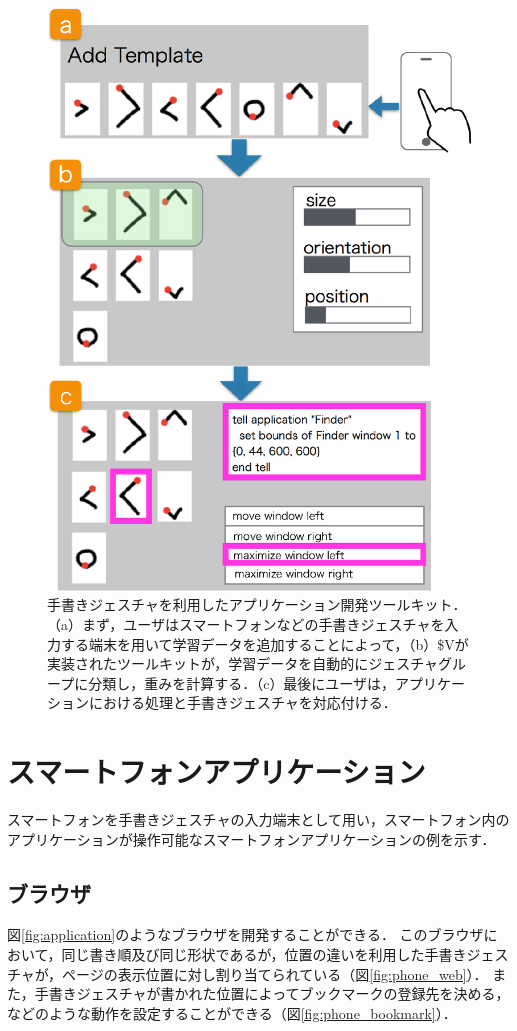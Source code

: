\begin{figure} [h!]
	\begin{center}
		\includegraphics [width=0.7\hsize ]{img/flow.eps}
	\end{center}
	\caption{手書きジェスチャを利用したアプリケーション開発ツールキット．（a）まず，ユーザはスマートフォンなどの手書きジェスチャを入力する端末を用いて学習データを追加することによって，（b）\$Vが実装されたツールキットが，学習データを自動的にジェスチャグループに分類し，重みを計算する．（c）最後にユーザは，アプリケーションにおける処理と手書きジェスチャを対応付ける．}
	\label{fig:flow}
\end{figure}


\clearpage
\section{スマートフォンアプリケーション}
スマートフォンを手書きジェスチャの入力端末として用い，スマートフォン内のアプリケーションが操作可能なスマートフォンアプリケーションの例を示す．
\subsection{ブラウザ}
図\ref{fig:application}のようなブラウザを開発することができる．
このブラウザにおいて，同じ書き順及び同じ形状であるが，位置の違いを利用した手書きジェスチャが，ページの表示位置に対し割り当てられている（図\ref{fig:phone_web}）．
また，手書きジェスチャが書かれた位置によってブックマークの登録先を決める，などのような動作を設定することができる（図\ref{fig:phone_bookmark}）．

